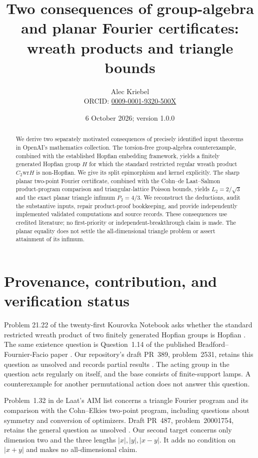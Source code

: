\documentclass[11pt]{article}
\title{Two consequences of group-algebra and planar Fourier certificates:\\wreath products and triangle bounds}
\author{Alec Kriebel\\\small ORCID: \href{https://orcid.org/0009-0001-9320-500X}{0009-0001-9320-500X}}
\date{6 October 2026; version 1.0.0}
\newcommand{\wrp}{\mathbin{\mathrm{wr}}}
\begin{document}
\maketitle
\begin{abstract}
We derive two separately motivated consequences of precisely identified input theorems in OpenAI's mathematics collection. The torsion-free group-algebra counterexample, combined with the established Hopfian embedding framework, yields a finitely generated Hopfian group $H$ for which the standard restricted regular wreath product $C_2\wrp H$ is non-Hopfian. We give its split epimorphism and kernel explicitly. The sharp planar two-point Fourier certificate, combined with the Cohn--de Laat--Salmon product-program comparison and triangular-lattice Poisson bounds, yields $L_2=2/\sqrt3$ and the exact planar triangle infimum $P_2=4/3$. We reconstruct the deductions, audit the substantive inputs, repair product-proof bookkeeping, and provide independently implemented validated computations and source records. These consequences use credited literature; no first-priority or independent-breakthrough claim is made. The planar equality does not settle the all-dimensional triangle problem or assert attainment of its infimum.
\end{abstract}

\section{Provenance, contribution, and verification status}
Problem 21.22 of the twenty-first Kourovka Notebook asks whether the standard restricted wreath product of two finitely generated Hopfian groups is Hopfian \cite{kourovka}. The same existence question is Question~1.14 of the published Bradford--Fournier-Facio paper \cite{bff}. Our repository's draft PR~389, problem~2531, retains this question as unsolved and records partial results \cite{pr389}. The acting group in the question acts regularly on itself, and the base consists of finite-support lamps. A counterexample for another permutational action does not answer this question.

Problem~1.32 in de Laat's AIM list \cite{aim} concerns a triangle Fourier program and its comparison with the Cohn--Elkies two-point program, including questions about symmetry and conversion of optimizers. Draft PR~487, problem~20001754, retains the general question as unsolved \cite{pr487}. Our second target concerns only dimension two and the three lengths $|x|,|y|,|x-y|$. It adds no condition on $|x+y|$ and makes no all-dimensional claim.
\end{document}
